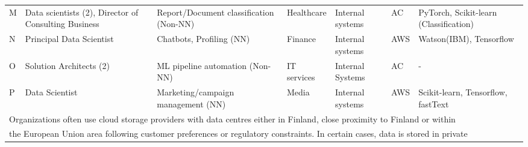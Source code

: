 \begin{table*}[t]
\begin{tabular}{p{}p{}p{3cm}p{}p{2cm}p{}p{}}
    M & Data scientists (2), Director of Consulting Business  & Report/Document classification (Non-NN) & Healthcare & Internal systems & AC & PyTorch, Scikit-learn (Classification) \\
    N & Principal Data Scientist & Chatbots, Profiling (NN) & Finance & Internal systems & AWS & Watson(IBM), Tensorflow \\
    O & Solution Architects (2)& ML pipeline automation (Non-NN) & IT services & Internal Systems & AC & - \\
    P & Data Scientist & Marketing/campaign management (NN) & Media & Internal systems & AWS & Scikit-learn, Tensorflow, fastText \\
    \hline
    
       
    \multicolumn{7}{l}{
    Organizations often use cloud storage providers with data centres  either in Finland, close proximity to Finland or within}\\
    
    \multicolumn{7}{l}{the European Union area following customer preferences or regulatory constraints. In certain cases, data is stored in private }\\
    
    \end{tabular}%
  \label{tab:data_source_storage_mlframeworks_interviewees}%
\end{table*}%